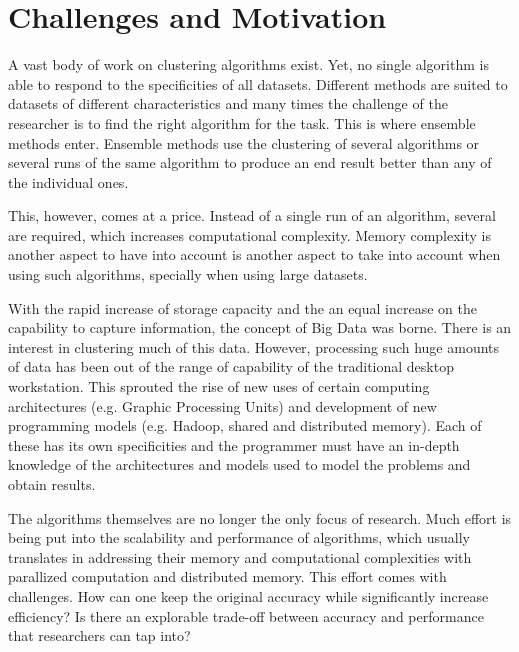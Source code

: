 
\section{Challenges and Motivation}

A vast body of work on clustering algorithms exist. Yet, no single algorithm is able to respond to the specificities of all datasets. Different methods are suited to datasets of different characteristics and many times the challenge of the researcher is to find the right algorithm for the task. This is where ensemble methods enter. Ensemble methods use the clustering of several algorithms or several runs of the same algorithm to produce an end result better than any of the individual ones.

This, however, comes at a price. Instead of a single run of an algorithm, several are required, which increases computational complexity. Memory complexity is another aspect to have into account is another aspect to take into account when using such algorithms, specially when using large datasets.

With the rapid increase of storage capacity and the an equal increase on the capability to capture information, the concept of Big Data was borne. There is an interest in clustering much of this data. However, processing such huge amounts of data has been out of the range of capability of the traditional desktop workstation. This sprouted the rise of new uses of certain computing architectures (e.g. Graphic Processing Units) and development of new programming models (e.g. Hadoop, shared and distributed memory). Each of these has its own specificities and the programmer must have an in-depth knowledge of the architectures and models used to model the problems and obtain results.

The algorithms themselves are no longer the only focus of research. Much effort is being put into the scalability and performance of algorithms, which usually translates in addressing their memory and computational complexities with parallized computation and distributed memory. This effort comes with challenges. How can one keep the original accuracy while significantly increase efficiency? Is there an explorable trade-off between accuracy and performance that researchers can tap into?



